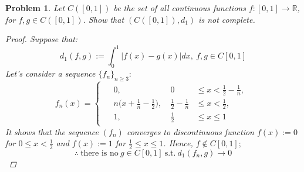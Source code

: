 \documentclass[a4paper,12pt]{article}
\newtheorem{prob}{Problem}[]
\newcommand{\R}{\mathbb{R}}
\begin{document}
\begin{prob}
	Let $C([0,1])$ be the set of all continuous functions $f:[0,1]\rightarrow \R$, for $f,g \in C([0,1])$. Show that $(C([0,1]),d_1)$ is not complete.\\
	\begin{proof}
		Suppose that:
		\begin{equation*}
		d_1 (f,g) := \int_{0}^{1} |f(x)-g(x)| dx,\ f,g \in C[0,1]
		\end{equation*}
		Let's consider a sequence $\{f_n\}_{n\geq 3}:$
		\begin{equation*}
		f_n(x) = \begin{cases}
		\begin{aligned}
		&0,\ &0 &\leq x < \frac{1}{2}-\frac{1}{n},\\
		&n\Bigg(x+\frac{1}{n}-\frac{1}{2}\Bigg), \ &\frac{1}{2}-\frac{1}{n} &\leq x < \frac{1}{2},\\
		&1,\ &\frac{1}{2} &\leq x \leq 1
		\end{aligned}
		\end{cases}
		\end{equation*}
		It shows that the sequence $(f_n)$ converges to discontinuous function $f(x):= 0$ for $0 \leq x < \frac{1}{2}$ and $f(x):=1$ for $\frac{1}{2}\leq x \leq 1$. Hence, $f \notin C[0,1];$
		\begin{equation*}
		\therefore\ \text{there is no}\ g \in C[0,1]\ \text{s.t.}\ d_1(f_n,g) \rightarrow 0
		\end{equation*}
	\end{proof}
\end{prob}
\end{document}
